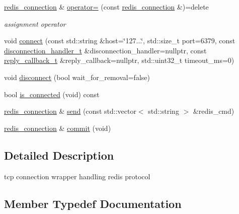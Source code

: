 \begin{DoxyCompactItemize}
\mbox{\hyperlink{classcpp__redis_1_1network_1_1redis__connection}{redis\+\_\+connection}} \& \mbox{\hyperlink{classcpp__redis_1_1network_1_1redis__connection_a54a4c28ad1b9e9f3bac2854fddf4e30d}{operator=}} (const \mbox{\hyperlink{classcpp__redis_1_1network_1_1redis__connection}{redis\+\_\+connection}} \&)=delete
\begin{DoxyCompactList}\small\item\em assignment operator \end{DoxyCompactList}\item 
void \mbox{\hyperlink{classcpp__redis_1_1network_1_1redis__connection_af105573e46eadbc34a9f5907832df19f}{connect}} (const std\+::string \&host=\char`\"{}127...\char`\"{}, std\+::size\+\_\+t port=6379, const \mbox{\hyperlink{classcpp__redis_1_1network_1_1redis__connection_aba1a229a3d36a5540a80776ed0cf9a44}{disconnection\+\_\+handler\+\_\+t}} \&disconnection\+\_\+handler=nullptr, const \mbox{\hyperlink{classcpp__redis_1_1network_1_1redis__connection_a40f4b55a3103b7436e34211893377245}{reply\+\_\+callback\+\_\+t}} \&reply\+\_\+callback=nullptr, std\+::uint32\+\_\+t timeout\+\_\+ms=0)
\item 
void \mbox{\hyperlink{classcpp__redis_1_1network_1_1redis__connection_a614a01ce8abd69b44f3d072423d2e696}{disconnect}} (bool wait\+\_\+for\+\_\+removal=false)
\item 
bool \mbox{\hyperlink{classcpp__redis_1_1network_1_1redis__connection_ad3d96826e2e67fb3fed23280237d4d9c}{is\+\_\+connected}} (void) const
\item 
\mbox{\hyperlink{classcpp__redis_1_1network_1_1redis__connection}{redis\+\_\+connection}} \& \mbox{\hyperlink{classcpp__redis_1_1network_1_1redis__connection_a98c163ce431e85e46e139211564b7b3f}{send}} (const std\+::vector$<$ std\+::string $>$ \&redis\+\_\+cmd)
\item 
\mbox{\hyperlink{classcpp__redis_1_1network_1_1redis__connection}{redis\+\_\+connection}} \& \mbox{\hyperlink{classcpp__redis_1_1network_1_1redis__connection_a8e6980d40139877c16e995051b780d60}{commit}} (void)
\end{DoxyCompactItemize}


\subsection{Detailed Description}
tcp connection wrapper handling redis protocol 

\subsection{Member Typedef Documentation}
\mbox{\label{classcpp__redis_1_1network_1_1redis__connection_aba1a229a3d36a5540a80776ed0cf9a44}} 
